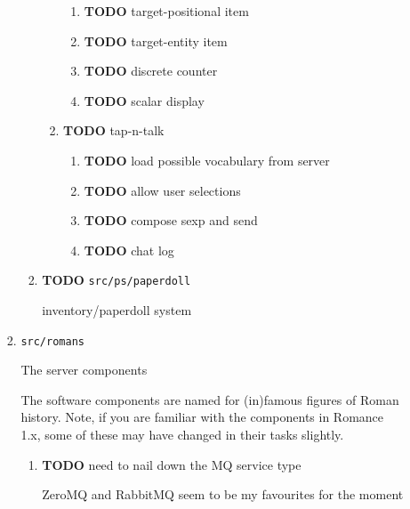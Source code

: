 \documentclass[11pt]{article}
\begin{document}
\begin{enumerate}
\begin{enumerate}
\begin{enumerate}
\begin{enumerate}
\begin{enumerate}
\begin{enumerate}
\item {\bfseries\sffamily TODO} target-positional item
\label{sec-5-4-1-4-2-9-1-4}

\item {\bfseries\sffamily TODO} target-entity item
\label{sec-5-4-1-4-2-9-1-5}

\item {\bfseries\sffamily TODO} discrete counter
\label{sec-5-4-1-4-2-9-1-6}

\item {\bfseries\sffamily TODO} scalar display
\label{sec-5-4-1-4-2-9-1-7}
\end{enumerate}
\item {\bfseries\sffamily TODO} tap-n-talk
\label{sec-5-4-1-4-2-9-2}

\begin{enumerate}
\item {\bfseries\sffamily TODO} load possible vocabulary from server
\label{sec-5-4-1-4-2-9-2-1}

\item {\bfseries\sffamily TODO} allow user selections
\label{sec-5-4-1-4-2-9-2-2}

\item {\bfseries\sffamily TODO} compose sexp and send
\label{sec-5-4-1-4-2-9-2-3}

\item {\bfseries\sffamily TODO} chat log
\label{sec-5-4-1-4-2-9-2-4}
\end{enumerate}
\end{enumerate}
\item {\bfseries\sffamily TODO} \texttt{src/ps/paperdoll}
\label{sec-5-4-1-4-2-10}

inventory/paperdoll system
\end{enumerate}

\item \texttt{src/romans}
\label{sec-5-4-1-4-3}

The server components

The software components are named for (in)famous figures of Roman
history. Note, if you are familiar with the components in Romance 1.x,
some of these may have changed in their tasks slightly.

\begin{enumerate}
\item {\bfseries\sffamily TODO} need to nail down the MQ service type
\label{sec-5-4-1-4-3-1}

ZeroMQ and RabbitMQ seem to be my favourites for the moment


\end{enumerate}
\end{enumerate}
\end{enumerate}
\end{enumerate}
\end{document}
